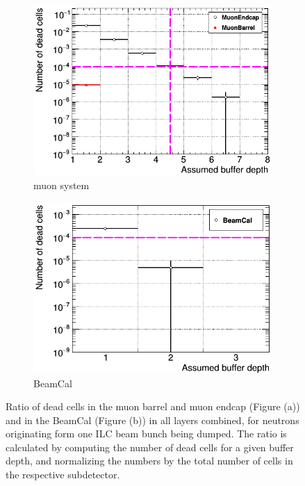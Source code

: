 \begin{figure}[!h]
 \centering
  \begin{subfigure}[b]{0.49\textwidth}
   \centering
    \includegraphics[width=\textwidth]{Figures/BeamDump/Occupancy_Comparison_All_layers_deadcells_BeamDump_Neutrons_MuonSystem.png}
   \caption{\sid muon system}
   \end{subfigure}
   \hfill
   \begin{subfigure}[b]{0.49\textwidth}
   \centering
    \includegraphics[width=\textwidth]{Figures/BeamDump/Occupancy_Comparison_All_layers_deadcells_BeamDump_Neutrons_BeamCal.png}
   \caption{\sid BeamCal}
   \end{subfigure}
   \caption[Neutron occupancy in the \sid muon system and BeamCal]{Ratio of dead cells in the \sid muon barrel and muon endcap (Figure (a)) and in the \sid BeamCal (Figure (b)) in all layers combined, for neutrons originating form one ILC beam bunch being dumped.
   The ratio is calculated by computing the number of dead cells for a given buffer depth, and normalizing the numbers by the total number of cells in the respective subdetector.}
   \label{fig:BeamDumps:NeutronOcc}
\end{figure} 

